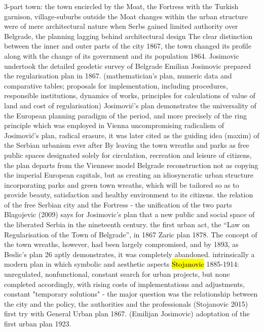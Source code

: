 \documentclass[11pt]{report}
\begin{document}
3-part town: the town encircled by the Moat, the Fortress with the Turkish garnison, village-suburbs outside the Moat
changes within the urban structure were of mere architectural nature when Serbs gained limited authority over Belgrade, the planning lagging behind architectural design
The clear distinction between the inner and outer parts of the city
1867, the town changed its profile along  with  the  change  of  its  government  and  its  population
1864. Josimovic undertook the detailed geodetic survey of Belgrade
Emilian Josimovic prepared the regularisation plan in 1867. (mathematician's plan, numeric data and comparative tables; proposals  for  implementation, 
including procedures, responsible institutions, dynamics of works, principles 
for calculations of value of land and cost of regularisation)
Josimović’s  plan  demonstrates  the  universality  of  the  European  planning paradigm of the period, and more precisely of the ring principle which was employed in Vienna
uncompromising  radicalism  of  Josimović’s plan,  radical erasure, it was later cited as the guiding idea (maxim) of the Serbian urbanism ever after
By leaving the town wreaths and parks as free  public  spaces  designated  solely  for  circulation,  recreation  and  leisure of  citizens,  the  plan  departs  from  the  Viennese  model
Belgrade reconstruction not as copying the imperial European capitals, but as  creating  an  idiosyncratic  urban  structure  incorporating  parks  and  green town wreaths, which will be tailored so as to provide beauty, satisfaction and healthy  environment  to  its  citizens.
the relation of the free Serbian city and the Fortress - the unification of the two parts
Blagojevic (2009) says for Josimovic's plan that  a new public and social space of the liberated Serbia in the nineteenth century. 
the  first  urban  act,  the  “Law  on Regularisation of the Town of Belgrade”, in 1867
Zaric plan 1878. The concept of the town wreaths, however, had been largely compromised, and by 1893, as Beslic’s plan 26  aptly demonstrates, it was completely abandoned. 
intrinsically a modern plan in which symbolic and aesthetic aspects
	\hl{Stojanovic} 1885-1914:
unregulated, nonfunctional, constant search for urban projects, but none completed accordingly, with rising costs of implementations and adjustments, constant "temporary solutions" - the major question was the relationship between the city and the policy, the authorities and the professionals
(Stojanovic 2015)
first try with General Urban plan 1867. (Emilijan Josimovic)
adoptation of the first urban plan 1923.
\end{document}
